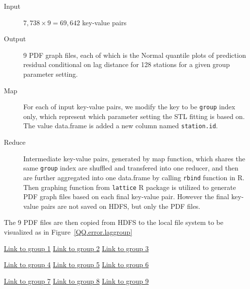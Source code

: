 \begin{description}
  \item[Input] $7,738 \times 9 = 69,642$ key-value pairs 
  \item[Output] 9 PDF graph files, each of which is the Normal quantile plots of
  prediction residual conditional on lag distance for 128 stations for a given
  group parameter setting.  
  \item[Map] For each of input key-value pairs, we modify the key to be 
  \texttt{group} index only, which represent which parameter setting the STL fitting
  is based on. The value data.frame is added a new column named \texttt{station.id}.
  \item[Reduce] Intermediate key-value pairs, generated by map function, which 
  shares the same \texttt{group} index are shuffled and transfered into one reducer,
  and then are further aggregated into one data.frame by calling \texttt{rbind} 
  function in R. Then graphing function from \texttt{lattice} R package is utilized
  to generate PDF graph files based on each final key-value pair. However the 
  final key-value pairs are not saved on HDFS, but only the PDF files. 
\end{description} 

The 9 PDF files are then copied from HDFS to the local file system to be visualized
as in Figure~{\ref*{QQ.error.laggroup}}

\begin{framed}
\begin{center}
  \href{../plots/a1950/E1/QQ.error.tmax.group.1.pdf}{Link to group 1} 
  \;\;\;\;\;\;\;\;\;\;
  \href{../plots/a1950/E1/QQ.error.tmax.group.2.pdf}{Link to group 2} 
  \;\;\;\;\;\;\;\;\;\;
  \href{../plots/a1950/E1/QQ.error.tmax.group.3.pdf}{Link to group 3}
\end{center}
\begin{center}
  \href{../plots/a1950/E1/QQ.error.tmax.group.4.pdf}{Link to group 4} 
  \;\;\;\;\;\;\;\;\;\;
  \href{../plots/a1950/E1/QQ.error.tmax.group.5.pdf}{Link to group 5} 
  \;\;\;\;\;\;\;\;\;\;
  \href{../plots/a1950/E1/QQ.error.tmax.group.6.pdf}{Link to group 6}
\end{center}
\begin{center}
  \href{../plots/a1950/E1/QQ.error.tmax.group.7.pdf}{Link to group 7} 
  \;\;\;\;\;\;\;\;\;\;
  \href{../plots/a1950/E1/QQ.error.tmax.group.8.pdf}{Link to group 8} 
  \;\;\;\;\;\;\;\;\;\;
  \href{../plots/a1950/E1/QQ.error.tmax.group.9.pdf}{Link to group 9}
  \label{QQ.error.laggroup}
\end{center}
\end{framed}

